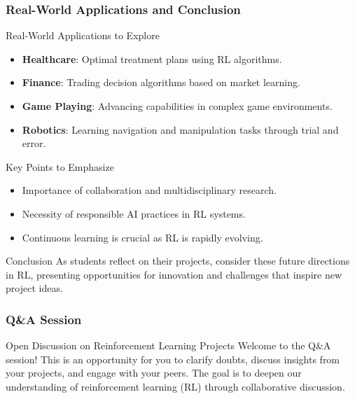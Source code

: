\documentclass[aspectratio=169]{beamer}
\begin{document}
\begin{frame}[fragile]
    \frametitle{Real-World Applications and Conclusion}
    \begin{block}{Real-World Applications to Explore}
        \begin{itemize}
            \item \textbf{Healthcare}: Optimal treatment plans using RL algorithms.
            \item \textbf{Finance}: Trading decision algorithms based on market learning.
            \item \textbf{Game Playing}: Advancing capabilities in complex game environments.
            \item \textbf{Robotics}: Learning navigation and manipulation tasks through trial and error.
        \end{itemize}
    \end{block}
    
    \begin{block}{Key Points to Emphasize}
        \begin{itemize}
            \item Importance of collaboration and multidisciplinary research.
            \item Necessity of responsible AI practices in RL systems.
            \item Continuous learning is crucial as RL is rapidly evolving.
        \end{itemize}
    \end{block}
    
    \begin{block}{Conclusion}
        As students reflect on their projects, consider these future directions in RL, presenting opportunities for innovation and challenges that inspire new project ideas.
    \end{block}
\end{frame}

\begin{frame}[fragile]
    \frametitle{Q\&A Session}
    \begin{block}{Open Discussion on Reinforcement Learning Projects}
        Welcome to the Q\&A session! This is an opportunity for you to clarify doubts, discuss insights from your projects, and engage with your peers. 
        The goal is to deepen our understanding of reinforcement learning (RL) through collaborative discussion.
    \end{block}
\end{frame}
\end{document}

